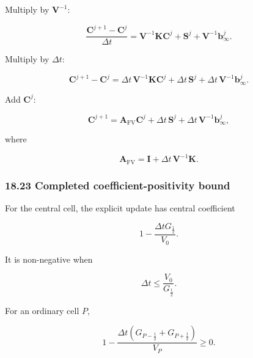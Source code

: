 \documentclass[11pt,a4paper]{article}
\begin{document}
Multiply by $\mathbf V^{-1}$:

\begin{equation}
\frac{
\mathbf C^{j+1}-\mathbf C^j
}{
\Delta t
}
=
\mathbf V^{-1}\mathbf K\mathbf C^j
+
\mathbf S^j
+
\mathbf V^{-1}\mathbf b_\infty^j.
\tag{TRISO-FV-290}
\label{eq:triso-fv-290}
\end{equation}

Multiply by $\Delta t$:

\begin{equation}
\mathbf C^{j+1}-\mathbf C^j
=
\Delta t\,\mathbf V^{-1}\mathbf K\mathbf C^j
+
\Delta t\,\mathbf S^j
+
\Delta t\,\mathbf V^{-1}\mathbf b_\infty^j.
\tag{TRISO-FV-291}
\label{eq:triso-fv-291}
\end{equation}

Add $\mathbf C^j$:

\begin{equation}
\boxed{
\mathbf C^{j+1}
=
\mathbf A_{\mathrm{FV}}\mathbf C^j
+
\Delta t\,\mathbf S^j
+
\Delta t\,\mathbf V^{-1}\mathbf b_\infty^j,
}
\tag{TRISO-FV-292}
\label{eq:triso-fv-292}
\end{equation}

where

\begin{equation}
\boxed{
\mathbf A_{\mathrm{FV}}
=
\mathbf I
+
\Delta t\,\mathbf V^{-1}\mathbf K.
}
\tag{TRISO-FV-293}
\label{eq:triso-fv-293}
\end{equation}

\subsubsection*{18.23 Completed coefficient-positivity bound}

For the central cell, the explicit update has central coefficient

\begin{equation}
1-
\frac{\Delta tG_{\frac12}}{V_0}.
\tag{TRISO-FV-294}
\label{eq:triso-fv-294}
\end{equation}

It is non-negative when

\begin{equation}
\boxed{
\Delta t
\le
\frac{V_0}{G_{\frac12}}.
}
\tag{TRISO-FV-295}
\label{eq:triso-fv-295}
\end{equation}

For an ordinary cell $P$,

\begin{equation}
1-
\frac{
\Delta t
\left(
G_{P-\frac12}+G_{P+\frac12}
\right)
}{
V_P
}
\ge0.
\tag{TRISO-FV-296}
\label{eq:triso-fv-296}
\end{equation}
\end{document}
